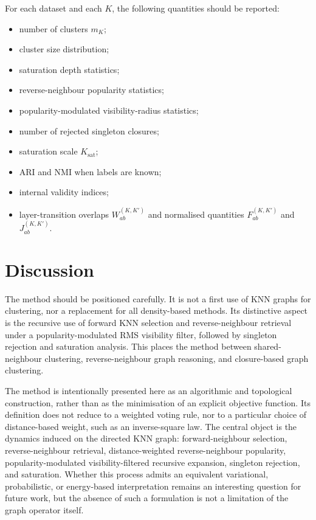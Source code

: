 \documentclass[pdflatex,sn-mathphys-num]{sn-jnl}
\begin{document}
For each dataset and each $K$, the following quantities should be reported:
\begin{itemize}
    \item number of clusters $m_K$;
    \item cluster size distribution;
    \item saturation depth statistics;
    \item reverse-neighbour popularity statistics;
    \item popularity-modulated visibility-radius statistics;
    \item number of rejected singleton closures;
    \item saturation scale $K_{\mathrm{sat}}$;
    \item ARI and NMI when labels are known;
    \item internal validity indices;
    \item layer-transition overlaps $W_{ab}^{(K,K')}$ and normalised quantities $F_{ab}^{(K,K')}$ and $J_{ab}^{(K,K')}$.
\end{itemize}

\section{Discussion}\label{sec:discussion}

The method should be positioned carefully. It is not a first use of KNN graphs for clustering, nor a replacement for all density-based methods. Its distinctive aspect is the recursive use of forward KNN selection and reverse-neighbour retrieval under a popularity-modulated RMS visibility filter, followed by singleton rejection and saturation analysis. This places the method between shared-neighbour clustering, reverse-neighbour graph reasoning, and closure-based graph clustering.

The method is intentionally presented here as an algorithmic and topological construction, rather than as the minimisation of an explicit objective function. Its definition does not reduce to a weighted voting rule, nor to a particular choice of distance-based weight, such as an inverse-square law. The central object is the dynamics induced on the directed KNN graph: forward-neighbour selection, reverse-neighbour retrieval, distance-weighted reverse-neighbour popularity, popularity-modulated visibility-filtered recursive expansion, singleton rejection, and saturation. Whether this process admits an equivalent variational, probabilistic, or energy-based interpretation remains an interesting question for future work, but the absence of such a formulation is not a limitation of the graph operator itself.
\end{document}
